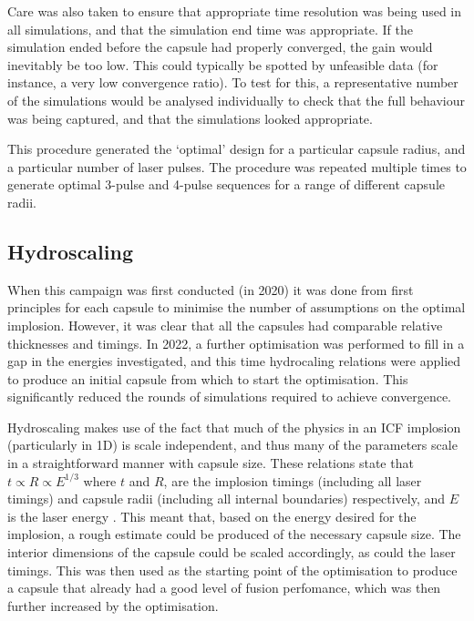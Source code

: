 Care was also taken to ensure that appropriate time resolution was being used in all simulations, and that the simulation end time was appropriate. If the simulation ended before the capsule had properly converged, the gain would inevitably be too low. This could typically be spotted by unfeasible data (for instance, a very low convergence ratio). To test for this, a representative number of the simulations would be analysed individually to check that the full behaviour was being captured, and that the simulations looked appropriate.

This procedure generated the `optimal' design for a particular capsule radius, and a particular number of laser pulses. The procedure was repeated multiple times to generate optimal 3-pulse and 4-pulse sequences for a range of different capsule radii.

\subsection{Hydroscaling}

When this campaign was first conducted (in 2020) it was done from first principles for each capsule to minimise the number of assumptions on the optimal implosion. However, it was clear that all the capsules had comparable relative thicknesses and timings. In 2022, a further optimisation was performed to fill in a gap in the energies investigated, and this time hydrocaling relations were applied to produce an initial capsule from which to start the optimisation. This significantly reduced the rounds of simulations required to achieve convergence.

Hydroscaling makes use of the fact that much of the physics in an ICF implosion (particularly in 1D) is scale independent, and thus many of the parameters scale in a straightforward manner with capsule size. These relations state that $t \propto R \propto E^{1/3}$ where $t$ and $R$, are the implosion timings (including all laser timings) and capsule radii (including all internal boundaries) respectively, and $E$ is the laser energy \cite{Nora2014}. This meant that, based on the energy desired for the implosion, a rough estimate could be produced of the necessary capsule size. The interior dimensions of the capsule could be scaled accordingly, as could the laser timings. This was then used as the starting point of the optimisation to produce a capsule that already had a good level of fusion perfomance, which was then further increased by the optimisation.

